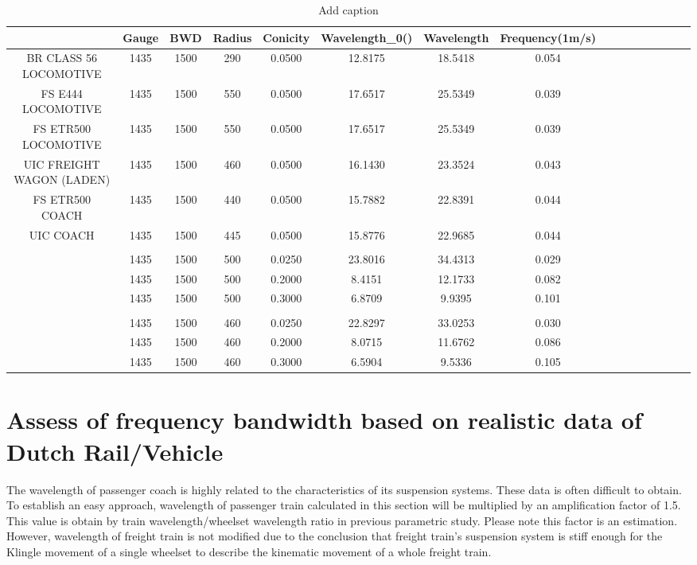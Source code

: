 \begin{table}[htbp]
  \centering
  \caption{Add caption}
    \begin{tabular}{cccccccccccccccc}
    \toprule
    & Gauge & BWD & Radius & Conicity & Wavelength\_0() &Wavelength & Frequency(1m/s) \\
    \midrule
    BR CLASS 56 LOCOMOTIVE  & 1435 & 1500 & 290 & 0.0500 & 12.8175 & 18.5418 & 0.054 \\
    FS E444 LOCOMOTIVE  & 1435 & 1500 & 550 & 0.0500 & 17.6517 & 25.5349 & 0.039 \\
    FS ETR500 LOCOMOTIVE  & 1435 & 1500 & 550 & 0.0500 & 17.6517 & 25.5349 & 0.039 \\
    UIC FREIGHT WAGON (LADEN)  & 1435 & 1500 & 460 & 0.0500 & 16.1430 & 23.3524 & 0.043 \\
    FS ETR500 COACH  & 1435 & 1500 & 440 & 0.0500 & 15.7882 & 22.8391 & 0.044 \\
    UIC COACH  & 1435 & 1500 & 445 & 0.0500 & 15.8776 & 22.9685 & 0.044 \\
    \textbf{}       &       &       &       &       &       &       &  \\
    \textbf{} & 1435 & 1500 & 500 & 0.0250 & 23.8016 & 34.4313 & 0.029 \\
    \textbf{} & 1435 & 1500 & 500 & 0.2000 & 8.4151 & 12.1733 & 0.082 \\
    \textbf{} & 1435 & 1500 & 500 & 0.3000 & 6.8709 & 9.9395 & 0.101 \\
    \textbf{}       &       &       &       &       &       &       &  \\
    \textbf{} & 1435 & 1500 & 460 & 0.0250 & 22.8297 & 33.0253 & 0.030 \\
    \textbf{} & 1435 & 1500 & 460 & 0.2000 & 8.0715 & 11.6762 & 0.086 \\
    \textbf{} & 1435 & 1500 & 460 & 0.3000 & 6.5904 & 9.5336 & 0.105 \\
    \bottomrule
    \end{tabular}%
  \label{tab:addlabel}%
\end{table}%




\section{Assess of frequency bandwidth based on realistic data of Dutch Rail/Vehicle}

The wavelength of passenger coach is highly related to the characteristics of its suspension systems. These data is often difficult to obtain. To establish an easy approach, wavelength of passenger train calculated in this section will be multiplied by an amplification factor of 1.5. This value is obtain by train wavelength/wheelset wavelength ratio in previous parametric study. Please note this factor is an estimation. However, wavelength of freight train is not modified due to the conclusion that freight train's suspension system is stiff enough for the Klingle movement of a single wheelset to describe the kinematic movement of a whole freight train.

